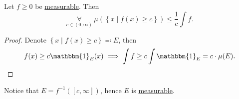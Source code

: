\begin{lemma}\label{lma:Markov-inequality}
	Let \(f\geq 0\) be \hyperref[def:measurable-function]{measurable}. Then
	\[
		\underset{c\in (0, \infty )}{\forall }\ \mu \left(\left\{x  \mid f(x)\geq c\right\}\right)\leq \frac{1}{c}\int f.
	\]
\end{lemma}
\begin{proof}
	Denote \(\left\{x  \mid f(x)\geq c\right\} \eqqcolon E\), then
	\[
		f(x)\geq c \mathbbm{1}_{E}(x) \implies \int f \geq c\int \mathbbm{1}_{E} = c\cdot \mu (E).
	\]
\end{proof}
\begin{remark}
	Notice that \(E = f^{-1} ([c, \infty])\), hence \(E\) is \hyperref[def:measurable-space]{measurable}.
\end{remark}


